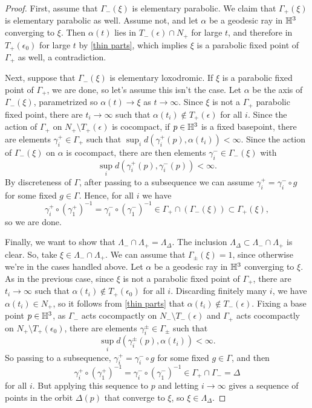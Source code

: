 \documentclass[12pt]{amsart}
\theoremstyle{definition}
\theoremstyle{remark}
\begin{document}
\begin{proof}
	First, assume that $\Gamma_-(\xi) $ is elementary parabolic. We claim that $\Gamma_+(\xi)$ is elementary parabolic as well. Assume not, and let $\alpha$ be a geodesic ray in $\mathbb H^3$ converging to $\xi$. Then $\alpha(t)$ lies in $T_-(\epsilon) \cap N_+$ for large $t$, and therefore in $T_+(\epsilon_0) $ for large $t$ by \eqref{thin parts}, which implies $\xi$ is a parabolic fixed point of $\Gamma_+$ as well, a contradiction.
	
	Next, suppose that $\Gamma_-(\xi)$ is elementary loxodromic. If $\xi$ is a parabolic fixed point of $\Gamma_+$, we are done, so let's assume this isn't the case. Let $\alpha$ be the axis of $\Gamma_-(\xi)$, parametrized so $\alpha(t)\to \xi$ as $t \to \infty$. Since $\xi$ is not a $\Gamma_+$ parabolic fixed point, there are $t_i\to\infty$ such that $\alpha(t_i) \not \in T_+(\epsilon)$ for all $i$. Since the action of $\Gamma_+$ on $N_+ \setminus T_+(\epsilon)$ is cocompact, if $p\in \mathbb H^3$ is a fixed basepoint, there are elements $\gamma_i^+ \in \Gamma_+$ such that $\sup_i d(\gamma_i^+(p),\alpha(t_i)) < \infty$. Since the action of $\Gamma_-(\xi)$ on $\alpha$ is cocompact, there are then elements $\gamma_i^-\in \Gamma_-(\xi)$ with  $$\sup_i d(\gamma_i^+(p),\gamma_i^-(p))< \infty.$$
	By discreteness of $\Gamma$, after passing to a subsequence we can assume  $\gamma_i^+ =\gamma^-_i\circ g$ for some fixed $g\in \Gamma$. Hence, for all $i$ we have
	$$\gamma_{i}^+ \circ (\gamma_{1}^+)^{-1} =  \gamma_{i}^- \circ (\gamma_{1}^-)^{-1} \in \Gamma_+ \cap (\Gamma_-(\xi)) \subset \Gamma_+(\xi),$$
	so we are done.
	
	\medskip
	
	Finally, we want to show that $\Lambda_- \cap \Lambda_+ = \Lambda_\Delta$. The inclusion $\Lambda_\Delta \subset \Lambda_- \cap \Lambda_+$ is clear. So, take $\xi \in \Lambda_- \cap \Lambda_+$. We can assume that $\Gamma_\pm(\xi)=1$, since otherwise we're in the cases handled above. Let $\alpha$ be a geodesic ray in $\mathbb H^3$ converging to $\xi$. As in the previous case, since $\xi$ is not a parabolic fixed point of $\Gamma_+$, there are $t_i\to\infty$ such that $\alpha(t_i) \not \in T_+(\epsilon_0)$ for all $i$.  Discarding finitely many $i$, we have $\alpha(t_i) \in N_+$, so it follows from \eqref{thin parts} that $\alpha(t_i) \not \in T_-(\epsilon)$. Fixing a base point $p\in \mathbb H^3$, as  $\Gamma_-$ acts cocompactly on  $N_- \setminus T_-(\epsilon)$ and $\Gamma_+$ acts cocompactly on $N_+ \setminus T_+(\epsilon_0)$, there are elements $\gamma_i^\pm \in \Gamma_\pm$ such that $$\sup_i d(\gamma_i^\pm(p),\alpha(t_i))< \infty.$$ So passing to a subsequence, $\gamma_i^+ = \gamma_i^-\circ g$ for some fixed $g\in \Gamma$, and then $$\gamma_{i}^+ \circ (\gamma_{1}^+)^{-1} =  \gamma_{i}^- \circ (\gamma_{1}^-)^{-1} \in \Gamma_+ \cap \Gamma_-=\Delta$$
	for all $i$. But applying this sequence to $p$ and letting $i\to \infty$ gives a sequence of points in the orbit $\Delta(p)$ that converge to $\xi$, so $\xi \in \Lambda_\Delta$.\end{proof}
\end{document}
